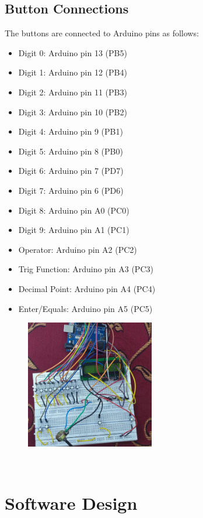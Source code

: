 \documentclass[12pt,a4paper]{article}
\begin{document}
\subsection{Button Connections}
The buttons are connected to Arduino pins as follows:
\begin{itemize}
    \item Digit 0: Arduino pin 13 (PB5)
    \item Digit 1: Arduino pin 12 (PB4)
    \item Digit 2: Arduino pin 11 (PB3)
    \item Digit 3: Arduino pin 10 (PB2)
    \item Digit 4: Arduino pin 9 (PB1)
    \item Digit 5: Arduino pin 8 (PB0)
    \item Digit 6: Arduino pin 7 (PD7)
    \item Digit 7: Arduino pin 6 (PD6)
    \item Digit 8: Arduino pin A0 (PC0)
    \item Digit 9: Arduino pin A1 (PC1)
    \item Operator: Arduino pin A2 (PC2)
    \item Trig Function: Arduino pin A3 (PC3)
    \item Decimal Point: Arduino pin A4 (PC4)
    \item Enter/Equals: Arduino pin A5 (PC5)
\end{itemize}

\begin{figure}[h]
    \centering
    \includegraphics[width=0.5\textwidth]{circuit.jpeg} %
    
    \label{fig:lcd_circuit}
\end{figure}\\
\section{Software Design}
\end{document}
